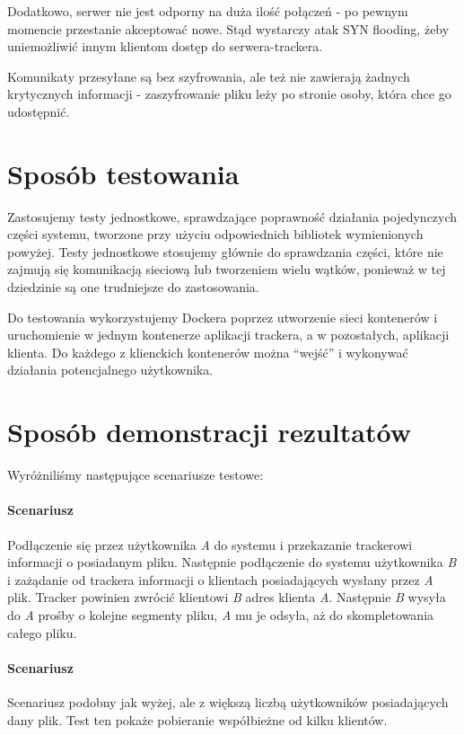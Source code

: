 \documentclass[11pt]{article}
\begin{document}
Dodatkowo, serwer nie jest odporny na duża ilość połączeń - po pewnym momencie przestanie akceptować nowe. Stąd wystarczy atak SYN flooding, żeby uniemożliwić innym klientom dostęp do serwera-trackera.	

Komunikaty przesyłane są bez szyfrowania, ale też nie zawierają żadnych krytycznych informacji - zaszyfrowanie pliku leży po stronie osoby, która chce go udostępnić. 

\section{Sposób testowania}
Zastosujemy testy jednostkowe, sprawdzające poprawność działania pojedynczych części systemu, tworzone przy użyciu odpowiednich bibliotek wymienionych powyżej. Testy jednostkowe stosujemy głównie do sprawdzania części, które nie zajmują się komunikacją sieciową lub tworzeniem wielu wątków, ponieważ w tej dziedzinie są one trudniejsze do zastosowania.

Do testowania wykorzystujemy Dockera poprzez utworzenie sieci kontenerów i uruchomienie w jednym kontenerze aplikacji trackera, a w pozostałych,  aplikacji klienta. Do każdego z klienckich kontenerów można “wejść” i wykonywać działania potencjalnego użytkownika.

\newcommand{\RomanNumeralCaps}[1]
    {\MakeUppercase{\romannumeral #1}}
\clearpage
\section{Sposób demonstracji rezultatów}
Wyróżniliśmy następujące scenariusze testowe:
\paragraph{Scenariusz \RomanNumeralCaps{1}} Podłączenie się przez użytkownika \textsl{A} do systemu i przekazanie trackerowi informacji o posiadanym pliku. Następnie podłączenie do systemu użytkownika \textsl{B} i zażądanie od trackera informacji o klientach posiadających wysłany przez \textsl{A} plik. Tracker powinien zwrócić klientowi \textsl{B} adres klienta \textsl{A}. Następnie \textsl{B} wysyła do \textsl{A} prośby o kolejne segmenty pliku, \textsl{A} mu je odsyła, aż do skompletowania całego pliku.
\paragraph{Scenariusz \RomanNumeralCaps{2}} Scenariusz podobny jak wyżej, ale z większą liczbą użytkowników posiadających dany plik. Test ten pokaże pobieranie współbieżne od kilku klientów.
\end{document}
